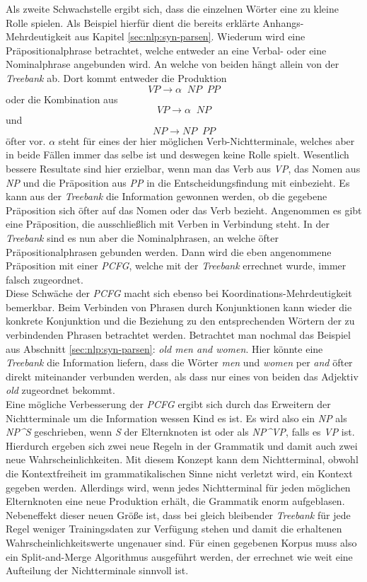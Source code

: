 Als zweite Schwachstelle ergibt sich, dass die einzelnen Wörter eine zu kleine Rolle spielen. Als Beispiel hierfür dient die bereits erklärte Anhangs-Mehrdeutigkeit aus Kapitel \ref{sec:nlp:syn-parsen}. Wiederum wird eine Präpositionalphrase betrachtet, welche entweder an eine Verbal- oder eine Nominalphrase angebunden wird. An welche von beiden hängt allein von der \textit{Treebank} ab. Dort kommt entweder die Produktion \[ VP  \to  \alpha \;\;  NP \;\; PP \] oder die Kombination aus \[ VP  \to  \alpha \;\; NP \] und \[ NP  \to  NP \;\; PP \] öfter vor. \( \alpha \) steht für eines der hier möglichen Verb-Nichtterminale, welches aber in beide Fällen immer das selbe ist und deswegen keine Rolle spielt. Wesentlich bessere Resultate sind hier erzielbar, wenn man das Verb aus \textit{VP}, das Nomen aus \textit{NP} und die Präposition aus \textit{PP} in die Entscheidungsfindung mit einbezieht. Es kann aus der \textit{Treebank} die Information gewonnen werden, ob die gegebene Präposition sich öfter auf das Nomen oder das Verb bezieht. Angenommen es gibt eine Präposition, die ausschließlich mit Verben in Verbindung steht. In der \textit{Treebank} sind es nun aber die Nominalphrasen, an welche öfter Präpositionalphrasen gebunden werden. Dann wird die eben angenommene Präposition mit einer \textit{PCFG}, welche mit der \textit{Treebank} errechnet wurde, immer falsch zugeordnet. \\ Diese Schwäche der \textit{PCFG} macht sich ebenso bei Koordinations-Mehrdeutigkeit bemerkbar. Beim Verbinden von Phrasen durch Konjunktionen kann wieder die konkrete Konjunktion und die Beziehung zu den entsprechenden Wörtern der zu verbindenden Phrasen betrachtet werden. Betrachtet man nochmal das Beispiel aus Abschnitt \ref{sec:nlp:syn-parsen}: \textit{old men and women}. Hier könnte eine \textit{Treebank} die Information liefern, dass die Wörter \textit{men} und \textit{women} per \textit{and} öfter direkt miteinander verbunden werden, als dass nur eines von beiden das Adjektiv \textit{old} zugeordnet bekommt. \\
Eine mögliche Verbesserung der \textit{PCFG} ergibt sich durch das Erweitern der Nichtterminale um die Information wessen Kind es ist. Es wird also ein \textit{NP} als \textit{NP\^{}S} geschrieben, wenn \textit{S} der Elternknoten ist oder als \textit{NP\^{}VP}, falls es \textit{VP} ist. Hierdurch ergeben sich zwei neue Regeln in der Grammatik und damit auch zwei neue Wahrscheinlichkeiten. Mit diesem Konzept kann dem Nichtterminal, obwohl die Kontextfreiheit im grammatikalischen Sinne nicht verletzt wird, ein Kontext gegeben werden. Allerdings wird, wenn jedes Nichtterminal für jeden möglichen Elternknoten eine neue Produktion erhält, die Grammatik enorm aufgeblasen. Nebeneffekt dieser neuen Größe ist, dass bei gleich bleibender \textit{Treebank} für jede Regel weniger Trainingsdaten zur Verfügung stehen und damit die erhaltenen Wahrscheinlichkeitswerte ungenauer sind. Für einen gegebenen Korpus muss also ein Split-and-Merge Algorithmus ausgeführt werden, der errechnet wie weit eine Aufteilung der Nichtterminale sinnvoll ist.  


